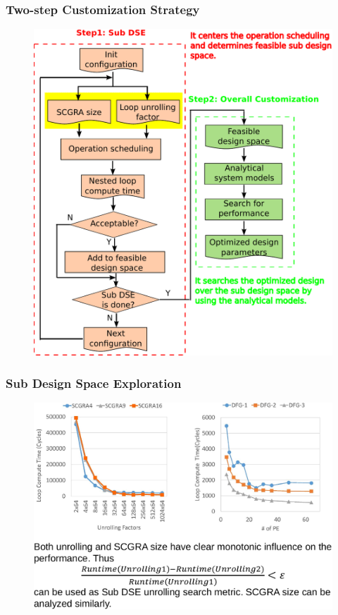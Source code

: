 \documentclass[accentcolor=tud1a,colorbacktitle,inverttitle,landscape,german,presentation,t]{tudbeamer}
\begin{document}
  \begin{frame}
  \frametitle{Two-step Customization Strategy}
  \vspace{-1em}
  \begin{figure}
     \includegraphics[width=.6\linewidth]{customization-framework}
  \end{figure}
  \end{frame}

  \begin{frame}
  \frametitle{Sub Design Space Exploration}
  \vspace{-0.7em}
  \begin{figure}
     \includegraphics[width=.8\linewidth]{sub-dse}
  \end{figure}
  \end{frame}
\end{document}
